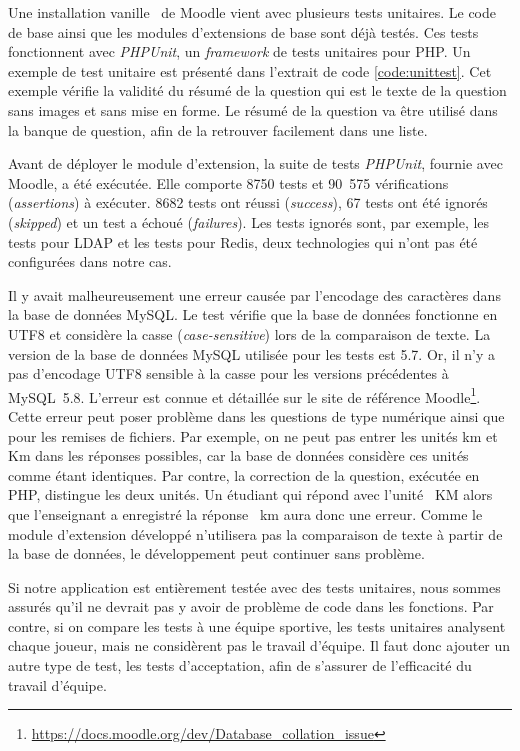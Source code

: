 Une installation \og vanille \fg\ de Moodle vient avec plusieurs tests unitaires.
Le code de base ainsi que les modules d'extensions de base sont d\'ej\`a test\'es.
Ces tests fonctionnent avec \textit{PHPUnit}, un \textit{framework} de tests unitaires pour PHP.
Un exemple de test unitaire est pr\'esent\'e dans l'extrait de code \ref{code:unittest}.
Cet exemple v\'erifie la validit\'e du r\'esum\'e de la question qui est le texte de la question sans images et sans mise en forme.
Le r\'esum\'e de la question va \^etre utilis\'e dans la banque de question, afin de la retrouver facilement dans une liste.


Avant de d\'eployer le module d'extension, la suite de tests \textit{PHPUnit}, fournie avec Moodle, a \'et\'e ex\'ecut\'ee.
Elle comporte 8750 tests et 90~575 v\'erifications (\textit{assertions}) \`a ex\'ecuter.
8682 tests ont r\'eussi (\textit{success}), 67 tests ont \'et\'e ignor\'es (\textit{skipped}) et un test a \'echou\'e (\textit{failures}).
Les tests ignor\'es sont, par exemple, les tests pour LDAP et les tests pour Redis, deux technologies qui n'ont pas \'et\'e configur\'ees dans notre cas.

Il y avait malheureusement une erreur caus\'ee par l'encodage des caract\`eres dans la base de donn\'ees MySQL.
Le test v\'erifie que la base de donn\'ees fonctionne en UTF8 et consid\`ere la casse (\textit{case-sensitive}) lors de la comparaison de texte.
La version de la base de donn\'ees MySQL utilis\'ee pour les tests est 5.7.
Or, il n'y a pas d'encodage UTF8 sensible \`a la casse pour les versions pr\'ec\'edentes \`a MySQL~5.8.
L'erreur est connue et d\'etaill\'ee sur le site de r\'ef\'erence Moodle\footnote{\url{https://docs.moodle.org/dev/Database_collation_issue}}.
Cette erreur peut poser probl\`eme dans les questions de type num\'erique ainsi que pour les remises de fichiers.
Par exemple, on ne peut pas entrer les unit\'es \og km \fg{} et \og Km \fg{} dans les r\'eponses possibles, car la base de donn\'ees consid\`ere ces unit\'es comme \'etant identiques.
Par contre, la correction de la question, ex\'ecut\'ee en PHP, distingue les deux unit\'es.
Un \'etudiant qui r\'epond avec l'unit\'e ~KM \fg{} alors que l'enseignant a enregistr\'e la r\'eponse ~km \fg{} aura donc une erreur.
Comme le module d'extension d\'evelopp\'e n'utilisera pas la comparaison de texte \`a partir de la base de donn\'ees, le d\'eveloppement peut continuer sans probl\`eme.

Si notre application est enti\`erement test\'ee avec des tests unitaires, nous sommes assur\'es qu'il ne devrait pas y avoir de probl\`eme de code dans les fonctions.
Par contre, si on compare les tests \`a une \'equipe sportive, les tests unitaires analysent chaque joueur, mais ne consid\`erent pas le travail d'\'equipe.
Il faut donc ajouter un autre type de test, les tests d'acceptation, afin de s'assurer de l'efficacit\'e du travail d'\'equipe.

